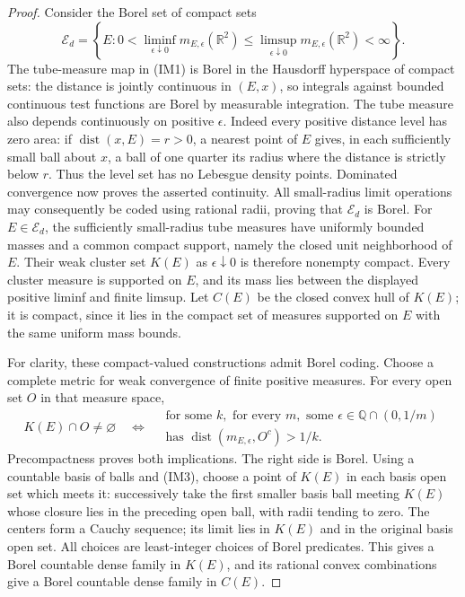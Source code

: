 \documentclass[11pt]{article}
\theoremstyle{definition}\newtheorem{definition}[theorem]{Definition}
\theoremstyle{remark}\newtheorem{remark}[theorem]{Remark}
\begin{document}
\begin{proof}
Consider the Borel set of compact sets
\[
 \mathcal E_d=\left\{E:
 0<\liminf_{\epsilon\downarrow0}m_{E,\epsilon}(\mathbb R^2)
   \le\limsup_{\epsilon\downarrow0}m_{E,\epsilon}(\mathbb R^2)<\infty\right\}.
\]
The tube-measure map in (IM1) is Borel in the Hausdorff hyperspace of
compact sets: the distance is jointly continuous in $(E,x)$, so integrals
against bounded continuous test functions are Borel by measurable
integration. The tube measure also depends continuously on positive
$\epsilon$. Indeed every positive distance level has zero area:
if $\operatorname{dist}(x,E)=r>0$, a nearest point of $E$ gives, in
each sufficiently small ball about $x$, a ball of one quarter its radius
where the distance is strictly below $r$. Thus the level set has no
Lebesgue density points. Dominated convergence now proves the asserted
continuity. All small-radius limit operations may consequently be coded
using rational radii, proving that $\mathcal E_d$ is Borel.
For $E\in\mathcal E_d$, the sufficiently small-radius tube measures have
uniformly bounded masses and a common compact support, namely the closed
unit neighborhood of $E$. Their weak cluster set $K(E)$ as $\epsilon\downarrow0$ is therefore
nonempty compact. Every cluster measure is supported on $E$, and its
mass lies between the displayed positive liminf and finite limsup.
Let $C(E)$ be the closed convex hull of $K(E)$; it is compact, since it
lies in the compact set of measures supported on $E$ with the same
uniform mass bounds.

For clarity, these compact-valued constructions admit Borel coding.
Choose a complete metric for weak convergence of finite positive measures.
For every open set $O$ in that measure space,
\[
 K(E)\cap O\ne\varnothing
 \quad\Longleftrightarrow\quad
 \begin{gathered}
 \text{for some }k,\text{ for every }m,\text{ some }
           \epsilon\in\mathbb Q\cap(0,1/m)\\
 \text{has }\operatorname{dist}(m_{E,\epsilon},O^c)>1/k.
 \end{gathered}
 \tag{IM3}
\]
Precompactness proves both implications. The right side is Borel.
Using a countable basis of balls and (IM3), choose a point of $K(E)$
in each basis open set which meets it: successively take the first
smaller basis ball meeting $K(E)$ whose closure lies in the preceding
open ball, with radii tending to zero. The centers form a Cauchy
sequence; its limit lies in $K(E)$ and in the original basis open set.
All choices are least-integer choices of Borel predicates.
This gives a Borel countable dense family in $K(E)$, and its rational
convex combinations give a Borel countable dense family in $C(E)$.


\end{proof}
\end{document}
